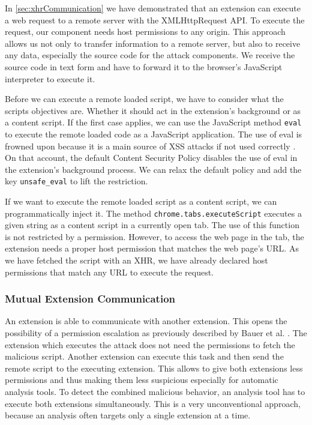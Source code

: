 	In \autoref{sec:xhrCommunication} we have demonstrated that an extension can execute a web request to a remote server with the XMLHttpRequest API. To execute the request, our component needs host permissions to any origin. This approach allows us not only to transfer information to a remote server, but also to receive any data, especially the source code for the attack components. We receive the source code in text form and have to forward it to the browser's JavaScript interpreter to execute it.
	
	Before we can execute a remote loaded script, we have to consider what the scripts objectives are. Whether it should act in the extension's background or as a content script. If the first case applies, we can use the JavaScript method \texttt{eval} to execute the remote loaded code as a JavaScript application. The use of eval is frowned upon because it is a main source of XSS attacks if not used correctly \cite{mozillaDangerousEval}. On that account, the default Content Security Policy disables the use of eval in the extension's background process. We can relax the default policy and add the key \texttt{unsafe\_eval} to lift the restriction.
	
	If we want to execute the remote loaded script as a content script, we can programmatically inject it. The method \texttt{chrome.tabs.executeScript} executes a given string as a content script in a currently open tab. The use of this function is not restricted by a permission. However, to access the web page in the tab, the extension needs a proper host permission that matches the web page's URL. As we have fetched the script with an XHR, we have already declared host permissions that match any URL to execute the request.
	
\subsubsection{Mutual Extension Communication}
\label{sec:mutalExtensionCommunication}

	An extension is able to communicate with another extension. This opens the possibility of a permission escalation as previously described by Bauer et al. \cite{extensions:cns14}. The extension which executes the attack does not need the permissions to fetch the malicious script. Another extension can execute this task and then send the remote script to the executing extension. This allows to give both extensions less permissions and thus making them less suspicious especially for automatic analysis tools. To detect the combined malicious behavior, an analysis tool has to execute both extensions simultaneously. This is a very unconventional approach, because an analysis often targets only a single extension at a time. 
	
